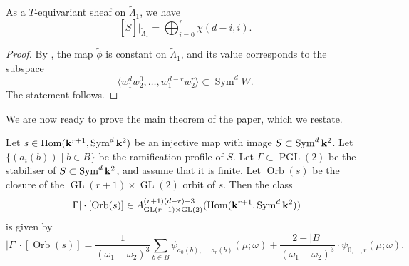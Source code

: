 \documentclass[11pt]{amsart}
\providecommand{\GL}{\operatorname{GL}}
\providecommand{\PGL}{\operatorname{PGL}}
\providecommand{\Hom}{\operatorname{Hom}}
\providecommand{\Sym}{\operatorname{Sym}}
\DeclareMathOperator{\Orb}{Orb}
\begin{document}
\begin{proposition}\label{prop:sl}
  As a \(T\)-equivariant sheaf on \(\widetilde \Lambda_1\), we have
  \[ [\widetilde S]|_{\widetilde{\Lambda}_{1}} = \bigoplus_{i=0}^{r}\chi(d-i,i).\]
\end{proposition}
\begin{proof}
  By , the map \(\widetilde \phi\) is constant on \(\widetilde \Lambda_1\), and its value corresponds to the subspace
  \[ \langle  w_1^dw_2^0, \dots, w_1^{d-r}w_2^r \rangle \subset \Sym^d W. \]
  The statement follows.
\end{proof}

We are now ready to prove the main theorem of the paper, which we restate.
\begin{theorem}\label{thm:realmain}
  Let \(s \in \Hom(\k^{r+1}, \Sym^d  \k^2)\) be an injective map with image \(S \subset \Sym^d\k^2\).
  Let \(\{(a_{i}(b)) \mid b \in B\}\) be the ramification profile of \(S\).
  Let \(\Gamma \subset  \PGL(2)\) be the stabiliser of \(S \subset \Sym^d\k^2\), and assume that it is finite.
  Let \(\Orb(s)\) be the closure of the \(\GL(r+1) \times \GL(2)\) orbit of \(s\).
  Then the class
  \[ |\Gamma| \cdot [\Orb(s)] \in A^{(r+1)(d-r)-3}_{\GL(r+1) \times \GL(2)}(\Hom(\k^{r+1}, \Sym^d \k^2)) \]
  is given by
  \[|\Gamma| \cdot [\Orb(s)] = \frac{1}{(\omega_1-\omega_2)^3}\sum_{b \in B}   \psi_{a_0(b), \dots, a_r(b)}(\mu;\omega) + \frac{2-|B|}{(\omega_1-\omega_2)^3} \cdot \psi_{0,\dots,r}(\mu;\omega).\]
\end{theorem}
\end{document}
